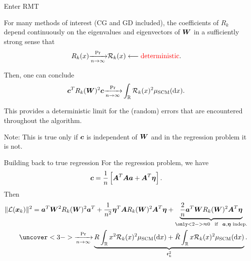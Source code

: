 \documentclass[9pt,aspectratio=169]{beamer}
\begin{document}
\begin{frame}{Enter RMT}

For many methods of interest (CG and GD included), the coefficients of $R_k$ depend continuously on the eigenvalues and eigenvectors of ${\boldsymbol W}$ in a sufficiently strong sense that
\begin{align*}
    R_k(x) { \xrightarrow[ n \to \infty]{\Pr }} \mathcal R_k(x)   \longleftarrow \text{\textcolor{red}{deterministic}}.
\end{align*}

Then, one can conclude
\begin{align*}
    {\boldsymbol c}^T R_k({\boldsymbol W})^2 {\boldsymbol c} { \xrightarrow[ n \to \infty]{\Pr }} \int_{\mathbb R} \mathcal R_k(x)^2 \mu_{\mathrm{SCM}}(\mathop{}\!\mathrm{d} x).
\end{align*}

This provides a deterministic limit for the (random) errors that are encountered throughout the algorithm.

Note:  This is true only if ${\boldsymbol c}$ is independent of ${\boldsymbol W}$ and in the regression problem it is not. 

\end{frame}

\begin{frame}{Building back to true regression}
For the regression problem, we have
\begin{align*}
    {\boldsymbol c} = \frac{1}{n} \left[{\boldsymbol A}^T{\boldsymbol A} {\boldsymbol a} + {\boldsymbol A}^T {\boldsymbol \eta} \right].
\end{align*}
Then
\begin{align*}
    \| \mathcal L(\xx_k) \|^2 = \aa^T \WW^2 R_k(\WW)^2 \aa^T + \frac{1}{n^2} \eeta^T \AA R_k(\WW)^2 \AA^T \eeta + \underbrace{\frac{2}{n} \aa^T \WW R_k(\WW)^2 \AA^T \eeta}_{\only<2->{\approx 0 ~~ \text{if} ~~ \aa, \eeta \text{ indep.}}}\\
    \uncover<3->{\Prto{n} \underbrace{R \int_{\mathbb R}x^2 \mathcal R_k(x)^2 \mu_{\mathrm{SCM}}(\dif x) + \tilde R \int_{\mathbb R} x \mathcal R_k(x)^2 \mu_{\mathrm{SCM}}(\dif x)}_{\mathfrak e_k^2}.}
\end{align*}


\end{frame}
\end{document}
